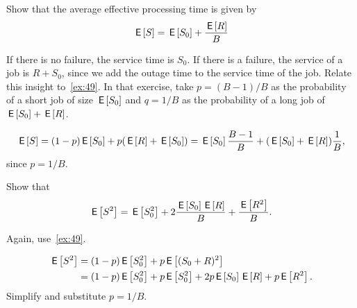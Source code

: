 \begin{exercise}
Show that the average effective processing time is given by
\begin{equation} \label{eq:88}
 \,\mathsf{E}\left[S\right] = \,\mathsf{E}\left[S_0\right] + \frac{\,\mathsf{E}\left[R\right]}B
\end{equation}

\begin{hint}
If there is no failure, the service time is $S_0$. If there is a failure, the service of a job is $R + S_0$, since we add the outage time to the service time of the job. Relate this insight to~\cref{ex:49}. In that exercise, take $p=(B-1)/B$ as the probability of a short job of size $\,\mathsf{E}\left[S_0\right]$ and $q=1/B$ as the probability of a long job of $\,\mathsf{E}\left[S_0\right] + \,\mathsf{E}\left[R\right]$. 
\end{hint}
\begin{solution}
 \begin{equation*}
 \,\mathsf{E}\left[S\right] = (1-p)\,\mathsf{E}\left[S_0\right] + p (\,\mathsf{E}\left[R\right] + \,\mathsf{E}\left[S_0\right]) = \,\mathsf{E}\left[S_0\right] \frac{B-1}B + (\,\mathsf{E}\left[S_0\right] + \,\mathsf{E}\left[R\right]) \frac 1B,
 \end{equation*}
since $p=1/B$. 
\end{solution}
\end{exercise}


\begin{extra}
 Show that
 \begin{equation*}
 \,\mathsf{E}\left[S^2\right] = \,\mathsf{E}\left[S_0^2\right] + 2\frac{\,\mathsf{E}\left[S_0\right]\,\mathsf{E}\left[R\right]} B + \frac{\,\mathsf{E}\left[R^2\right]}B.
 \end{equation*}
\begin{hint}
  Again, use~\cref{ex:49}.
\end{hint}
\begin{solution}
 \begin{align*}
 \,\mathsf{E}\left[S^2\right] 
&= (1-p) \,\mathsf{E}\left[S_0^2\right] + p \,\mathsf{E}\left[(S_0+R)^2\right]\\
&= (1-p) \,\mathsf{E}\left[S_0^2\right] + p \,\mathsf{E}\left[S_0^2\right] + 2 p \,\mathsf{E}\left[S_0\right] \,\mathsf{E}\left[R\right] + p \,\mathsf{E}\left[R^2\right]. 
 \end{align*}
 Simplify and substitute $p=1/B$. 
\end{solution}
\end{extra}

